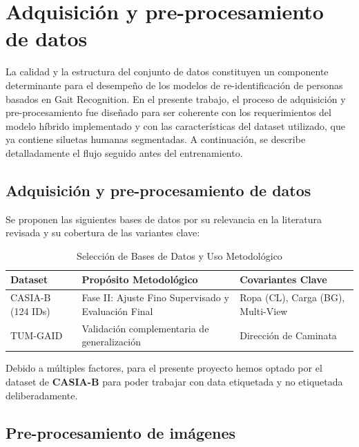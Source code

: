 \section{Adquisición y pre-procesamiento de datos}

La calidad y la estructura del conjunto de datos constituyen un componente determinante para el desempeño de los modelos de re-identificación de personas basados en Gait Recognition. En el presente trabajo, el proceso de adquisición y pre-procesamiento fue diseñado para ser coherente con los requerimientos del modelo híbrido implementado y con las características del dataset utilizado, que ya contiene siluetas humanas segmentadas. A continuación, se describe detalladamente el flujo seguido antes del entrenamiento.

\subsection{Adquisición y pre-procesamiento de datos}

Se proponen las siguientes bases de datos por su relevancia en la literatura revisada y su cobertura de las variantes clave:

\begin{table}[h]
    \centering
    \caption{Selección de Bases de Datos y Uso Metodológico}
    \label{tab:datasets}
    \begin{tabular}{l|p{3.5cm}|p{5cm}}
        \toprule
        \textbf{Dataset} & \textbf{Propósito Metodológico} & \textbf{Covariantes Clave} \\
        \midrule
        CASIA-B (124 IDs) & Fase II: Ajuste Fino Supervisado y Evaluación Final \cite{Li2020SemiSupGait} & Ropa (CL), Carga (BG), Multi-View \\
        TUM-GAID & Validación complementaria de generalización \cite{Purish2023GaitRecognition} & Dirección de Caminata \cite{Han2021LocalitySGE} \\
        \bottomrule
    \end{tabular}
\end{table}

Debido a múltiples factores, para el presente proyecto hemos optado por el dataset de \textbf{CASIA-B} para poder trabajar con data etiquetada y no etiquetada deliberadamente.

\subsection{Pre-procesamiento de imágenes}

